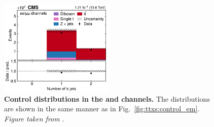 \begin{figure}[!hp]
\hfill
\includegraphics[width=0.49\textwidth]{figures/ttxs/nbtag_eemm.pdf}
\caption{
    \textbf{Control distributions in the \ee and \mumu channels.} The distributions are shown in the same manner as in Fig.~\ref{fig:ttxs:control_em}. \textit{Figure taken from }.
}
\label{fig:ttxs:control_eemm}
\end{figure}

